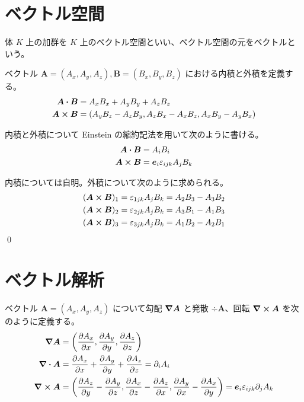 \documentclass[uplatex,dvipdfmx,a4paper,11pt]{jlreq}
\makeatletter
\newcommand{\rot}{\curl}
\renewcommand{\AA}{\bm{A}}
\newcommand{\BB}{\bm{B}}
\theoremstyle{definition}
\renewenvironment{proof}[1][\proofname]{\par
  \normalfont
  \topsep6\p@\@plus6\p@ \trivlist
  \item[\hskip\labelsep{\bfseries #1}\@addpunct{\bfseries}]\ignorespaces\quad\par
}{%
  \qed\endtrivlist\@endpefalse
}
\renewcommand\proofname{証明}
\makeatother
\begin{document}
\section{ベクトル空間}

\begin{definition}[ベクトル空間]
  体 $K$ 上の加群を $K$ 上のベクトル空間といい、ベクトル空間の元をベクトルという。
\end{definition}

\begin{definition}[ベクトル空間における内積と外積]
  ベクトル $\AA = (A_x, A_y, A_z), \BB = (B_x, B_y, B_z)$ における内積と外積を定義する。
  \begin{align}
    \AA\vdot\BB  & = A_xB_x + A_yB_y + A_zB_z                            \\
    \AA\cross\BB & = (A_yB_z - A_zB_y, A_zB_x - A_xB_z, A_xB_y - A_yB_x)
  \end{align}
\end{definition}

\begin{theorem}
  内積と外積について Einstein の縮約記法を用いて次のように書ける。
  \begin{align}
    \AA\vdot\BB  & = A_iB_i                          \\
    \AA\cross\BB & = \bm{e}_i\varepsilon_{ijk}A_jB_k
  \end{align}
\end{theorem}
\begin{proof}
  内積については自明。外積について次のように求められる。
  \begin{align}
    (\AA\cross\BB)_1 & = \varepsilon_{1jk}A_jB_k = A_2B_3 - A_3B_2 \\
    (\AA\cross\BB)_2 & = \varepsilon_{2jk}A_jB_k = A_3B_1 - A_1B_3 \\
    (\AA\cross\BB)_3 & = \varepsilon_{3jk}A_jB_k = A_1B_2 - A_2B_1
  \end{align}
\end{proof}

\section{ベクトル解析}
\begin{definition}
  ベクトル $\AA = (A_x, A_y, A_z)$ について勾配 $\grad{\AA}$ と発散 $\div{\AA}$、回転 $\rot{\AA}$ を次のように定義する。
  \begin{align}
    \grad{\bm{A}} & = \qty(\pdv{A_x}{x}, \pdv{A_y}{y}, \pdv{A_z}{z})                                                                                       \\
    \div{\bm{A}}  & = \pdv{A_x}{x} + \pdv{A_y}{y} + \pdv{A_z}{z} = \partial_iA_i                                                                           \\
    \rot{\bm{A}}  & = \qty(\pdv{A_z}{y} - \pdv{A_y}{z}, \pdv{A_x}{z} - \pdv{A_z}{x}, \pdv{A_y}{x} - \pdv{A_x}{y}) = \bm{e}_i\varepsilon_{ijk}\partial_jA_k
  \end{align}
\end{definition}
\end{document}
